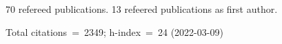 70 refereed publications. 13 refeered publications as first author.

Total citations~=~2349; h-index~=~24 (2022-03-09)
